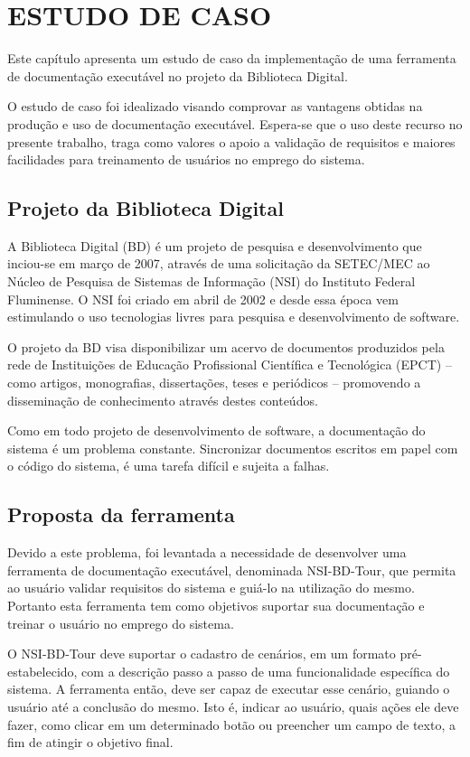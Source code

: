 \chapter{ESTUDO DE CASO}
Este capítulo apresenta um estudo de caso da implementação de uma ferramenta de documentação executável no projeto da Biblioteca Digital.

O estudo de caso foi idealizado visando comprovar as vantagens obtidas na produção e uso de documentação executável. Espera-se que o uso deste recurso no presente trabalho, traga como valores o apoio a validação de requisitos e maiores facilidades para treinamento de usuários no emprego do sistema.

\section{Projeto da Biblioteca Digital}

A Biblioteca Digital (BD) é um projeto de pesquisa e desenvolvimento que inciou-se em março de 2007, através de uma solicitação da SETEC/MEC ao Núcleo de Pesquisa de Sistemas de Informação (NSI) do Instituto Federal Fluminense. O NSI foi criado em abril de 2002 e desde essa época vem estimulando o uso tecnologias livres para pesquisa e desenvolvimento de software.

O projeto da BD visa disponibilizar um acervo de documentos produzidos pela rede de Instituições de Educação Profissional Científica e Tecnológica (EPCT) – como artigos, monografias, dissertações, teses e periódicos – promovendo a disseminação de conhecimento através destes conteúdos.

Como em todo projeto de desenvolvimento de software, a documentação do sistema é um problema constante. Sincronizar documentos escritos em papel com o código do sistema, é uma tarefa difícil e sujeita a falhas.

\section{Proposta da ferramenta}

Devido a este problema, foi levantada a necessidade de desenvolver uma ferramenta de documentação executável, denominada NSI-BD-Tour, que permita ao usuário validar requisitos do sistema e guiá-lo na utilização do mesmo. Portanto esta ferramenta tem como objetivos suportar sua documentação e treinar o usuário no emprego do sistema.

O NSI-BD-Tour deve suportar o cadastro de cenários, em um formato pré-estabelecido, com a descrição passo a passo de uma funcionalidade específica do sistema. A ferramenta então, deve ser capaz de executar esse cenário, guiando o usuário até a conclusão do mesmo. Isto é, indicar ao usuário, quais ações ele deve fazer, como clicar em um determinado botão ou preencher um campo de texto, a fim de atingir o objetivo final.

